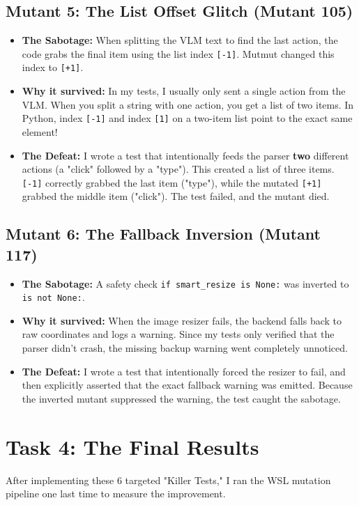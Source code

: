\documentclass[a4paper,12pt]{article}
\begin{document}
\subsection{Mutant 5: The List Offset Glitch (Mutant 105)}
\begin{itemize}
    \item \textbf{The Sabotage:} When splitting the VLM text to find the last action, the code grabs the final item using the list index \verb|[-1]|. Mutmut changed this index to \verb|[+1]|.
    \item \textbf{Why it survived:} In my tests, I usually only sent a single action from the VLM. When you split a string with one action, you get a list of two items. In Python, index \verb|[-1]| and index \verb|[1]| on a two-item list point to the exact same element! 
    \item \textbf{The Defeat:} I wrote a test that intentionally feeds the parser \textbf{two} different actions (a "click" followed by a "type"). This created a list of three items. \verb|[-1]| correctly grabbed the last item ("type"), while the mutated \verb|[+1]| grabbed the middle item ("click"). The test failed, and the mutant died.
\end{itemize}

\subsection{Mutant 6: The Fallback Inversion (Mutant 117)}
\begin{itemize}
    \item \textbf{The Sabotage:} A safety check \verb|if smart_resize is None:| was inverted to \verb|is not None:|.
    \item \textbf{Why it survived:} When the image resizer fails, the backend falls back to raw coordinates and logs a warning. Since my tests only verified that the parser didn't crash, the missing backup warning went completely unnoticed.
    \item \textbf{The Defeat:} I wrote a test that intentionally forced the resizer to fail, and then explicitly asserted that the exact fallback warning was emitted. Because the inverted mutant suppressed the warning, the test caught the sabotage.
\end{itemize}

\section{Task 4: The Final Results}
After implementing these 6 targeted "Killer Tests," I ran the WSL mutation pipeline one last time to measure the improvement.
\end{document}
